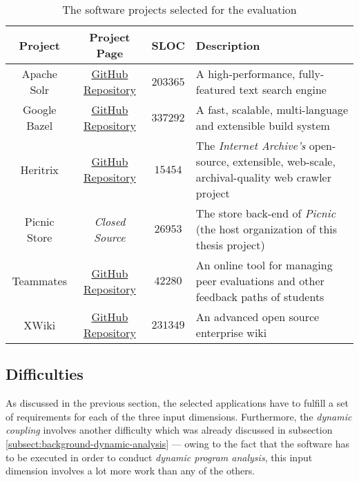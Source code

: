 \documentclass[12pt,a4paper]{report}
\begin{document}
\begin{table}[ht!]
\def\arraystretch{1.55}
\begin{tabularx}{\textwidth}{|c|c|c|X|}
\hline
Project & Project Page & SLOC & Description \\
\hline\hline

Apache Solr     & \href{https://github.com/apache/lucene-solr}{GitHub Repository} & $203365$ &
A high-performance, fully\hyp featured text search engine \\\hline

Google Bazel    & \href{https://github.com/bazelbuild/bazel}{GitHub Repository} & $337292$ &
A fast, scalable, multi-language and extensible build system \\\hline

Heritrix        & \href{https://github.com/internetarchive/heritrix3}{GitHub Repository} & $15454$ &
The \textit{Internet Archive's} open-source, extensible, web-scale, archival-quality web
crawler project \\\hline

Picnic Store & \textit{Closed Source} & $26953$ &
The store back-end of \textit{Picnic} (the host organization of this thesis project) \\\hline

Teammates       & \href{https://github.com/TEAMMATES/teammates}{GitHub Repository} & $42280$ &
An online tool for managing peer evaluations and other feedback paths of students \\\hline

XWiki           & \href{https://github.com/xwiki/xwiki-platform}{GitHub Repository} & $231349$ &
An advanced open source enterprise wiki \\\hline

\end{tabularx}
\caption{The software projects selected for the evaluation}
\label{table:evaluation-projects}
\end{table}


\subsection{Difficulties} \label{subsect:difficulties}

As discussed in the previous section, the selected applications have to fulfill
a set of requirements for each of the three input dimensions.
Furthermore, the \textit{dynamic coupling} involves another difficulty which
was already discussed in subsection \ref{subsect:background-dynamic-analysis} ---
owing to the fact that the software has to be executed in order to conduct
\textit{dynamic program analysis}, this input dimension involves a lot more work
than any of the others.
\end{document}
